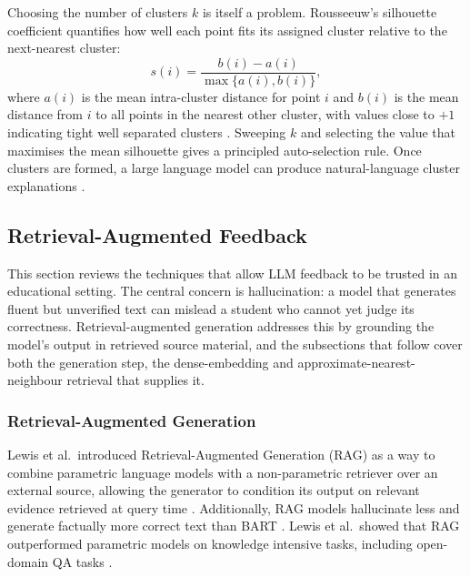 Choosing the number of clusters $k$ is itself a problem. Rousseeuw's silhouette coefficient quantifies how well each point fits its assigned cluster relative to the next-nearest cluster:
\begin{equation}
    s(i) = \frac{b(i) - a(i)}{\max\{a(i), b(i)\}},
    \label{eq:silhouette}
\end{equation}
where $a(i)$ is the mean intra-cluster distance for point $i$ and $b(i)$ is the mean distance from $i$ to all points in the nearest other cluster, with values close to $+1$ indicating tight well separated clusters \cite{rousseeuwSilhouettesGraphicalAid1987}. 
Sweeping $k$ and selecting the value that maximises the mean silhouette gives a principled auto-selection rule.
Once clusters are formed, a large language model can produce natural-language cluster explanations \cite{wangGoalDrivenExplainableClustering2023}.

\subsection{Retrieval-Augmented Feedback}
This section reviews the techniques that allow LLM feedback to be trusted in an educational setting. 
The central concern is hallucination: a model that generates fluent but unverified text can mislead a student who cannot yet judge its correctness. 
Retrieval-augmented generation addresses this by grounding the model's output in retrieved source material, and the subsections that follow cover both the generation step, the dense-embedding and approximate-nearest-neighbour retrieval that supplies it.




\subsubsection{Retrieval-Augmented Generation}

Lewis et al.\ introduced Retrieval-Augmented Generation (RAG) as a way to combine parametric language models with a non-parametric retriever over an external source, allowing the generator to condition its output on relevant evidence retrieved at query time \cite{lewisRetrievalAugmentedGenerationKnowledgeIntensive2020}.
 Additionally, RAG models hallucinate less and generate factually more correct text than BART \cite{lewisRetrievalAugmentedGenerationKnowledgeIntensive2020}.
Lewis et al.\ showed that RAG outperformed parametric models on knowledge intensive tasks, including open-domain QA tasks  \cite{lewisRetrievalAugmentedGenerationKnowledgeIntensive2020}.

